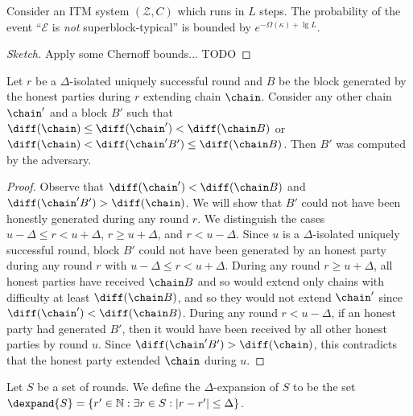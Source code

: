 \begin{theorem}
  Consider an ITM system $(\mathcal{Z}, C)$ which runs in $L$ steps.
  The probability of the event ``$\mathcal{E}$ is \emph{not}
  superblock-typical'' is bounded by $e^{-\Omega(\kappa) + \lg{L}}$.
\end{theorem}
\begin{proof}[Sketch]
  Apply some Chernoff bounds... TODO
\end{proof}

\begin{lemma}[Pairing]\label{lem:pairing}
  Let $r$ be a $\Delta$-isolated uniquely successful round and $B$ be the block
  generated by the honest parties during $r$ extending chain $\chain$. Consider
  any other chain $\chain'$ and a block $B'$ such that
  $\diff(\chain) \leq \diff(\chain') < \diff(\chain B)$
  or
  $\diff(\chain) < \diff(\chain' B') \leq \diff(\chain B)$.
  Then $B'$ was computed by the adversary.
\end{lemma}
\begin{proof}
  Observe that $\diff(\chain') < \diff(\chain B)$
  and $\diff(\chain' B') > \diff(\chain)$.
  We will show that $B'$ could not have been honestly generated during any
  round $r$. We distinguish the cases $u - \Delta \leq r < u + \Delta$,
  $r \geq u + \Delta$, and $r < u - \Delta$.
  Since $u$ is a $\Delta$-isolated uniquely successful round, block $B'$ could
  not have been generated by an honest party during any round $r$ with
  $u - \Delta \leq r < u + \Delta$.
  During any round $r \geq u + \Delta$, all honest parties have received
  $\chain B$ and so would extend only chains with difficulty at least
  $\diff(\chain B)$, and so they would not extend $\chain'$ since
  $\diff(\chain') < \diff(\chain B)$.
  During any round $r < u - \Delta$, if an honest party had generated $B'$, then
  it would have been received by all other honest parties by round $u$.
  Since $\diff(\chain' B') > \diff(\chain)$, this contradicts that the honest
  party extended $\chain$ during $u$.
\end{proof}

\begin{definition}
  Let $S$ be a set of rounds. We define the $\Delta$-expansion of $S$ to be the set
  $\dexpand{S} = \{r' \in \mathbb{N}: \exists r \in S: |r - r'| \leq \Delta\}$.
\end{definition}

